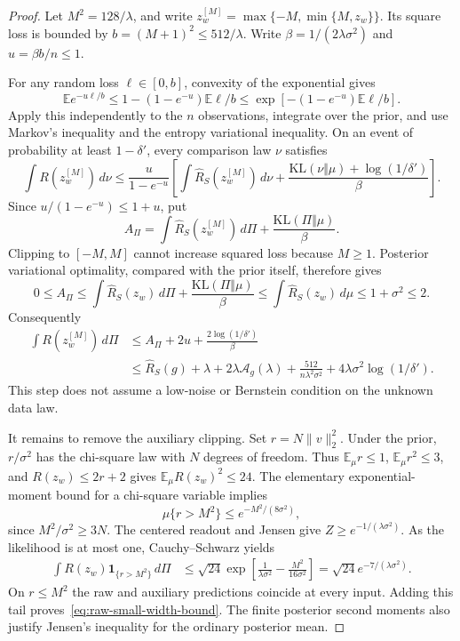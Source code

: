 \begin{proof}
Let $M^2=128/\lambda$, and write
$z_w^{[M]}=\max\{-M,\min\{M,z_w\}\}$.  Its square loss is bounded by
$b=(M+1)^2\leq512/\lambda$.  Write $\beta=1/(2\lambda\sigma^2)$ and
$u=\beta b/n\leq1$.

For any random loss $\ell\in[0,b]$, convexity of the exponential gives
\[
 \mathbb E e^{-u\ell/b}
 \leq1-(1-e^{-u})\mathbb E\ell/b
 \leq\exp[-(1-e^{-u})\mathbb E\ell/b].
\]
Apply this independently to the $n$ observations, integrate over the
prior, and use Markov's inequality and the entropy variational
inequality.  On an event of probability at least $1-\delta'$, every
comparison law $\nu$ satisfies
\[
 \int R(z_w^{[M]})\,d\nu
 \leq\frac{u}{1-e^{-u}}\left[
       \int\widehat R_S(z_w^{[M]})\,d\nu
       +\frac{\mathrm{KL}(\nu\Vert\mu)+\log(1/\delta')}{\beta}
                          \right].
\]
Since $u/(1-e^{-u})\leq1+u$, put
\[
 A_\Pi=\int\widehat R_S(z_w^{[M]})\,d\Pi
                  +\frac{\mathrm{KL}(\Pi\Vert\mu)}\beta.
\]
Clipping to $[-M,M]$ cannot increase squared loss because $M\geq1$.
Posterior variational optimality, compared with the prior itself,
therefore gives
\[
 0\leq A_\Pi
 \leq\int\widehat R_S(z_w)\,d\Pi
                  +\frac{\mathrm{KL}(\Pi\Vert\mu)}\beta
 \leq\int\widehat R_S(z_w)\,d\mu
 \leq1+\sigma^2\leq2.
\]
Consequently
\begin{align*}
 \int R(z_w^{[M]})\,d\Pi
 &\leq A_\Pi+2u+\frac{2\log(1/\delta')}{\beta}\\
 &\leq\widehat R_S(g)+\lambda+2\lambda\mathcal A_g(\lambda)
       +\frac{512}{n\lambda^2\sigma^2}
       +4\lambda\sigma^2\log(1/\delta').
\end{align*}
This step does not assume a low-noise or Bernstein condition on the
unknown data law.

It remains to remove the auxiliary clipping.  Set $r=N\|v\|_2^2$.
Under the prior, $r/\sigma^2$ has the chi-square law with $N$ degrees
of freedom.  Thus $\mathbb E_\mu r\leq1$,
$\mathbb E_\mu r^2\leq3$, and
$R(z_w)\leq2r+2$ gives $\mathbb E_\mu R(z_w)^2\leq24$.
The elementary exponential-moment bound for a chi-square variable
implies
\[
 \mu\{r>M^2\}\leq e^{-M^2/(8\sigma^2)},
\]
since $M^2/\sigma^2\geq3N$.  The centered readout and Jensen give
$Z\geq e^{-1/(\lambda\sigma^2)}$.  As the likelihood is at most one,
Cauchy--Schwarz yields
\begin{align*}
 \int R(z_w)\mathbf1_{\{r>M^2\}}\,d\Pi
 &\leq\sqrt{24}\exp\left[\frac1{\lambda\sigma^2}
                              -\frac{M^2}{16\sigma^2}\right]
 =\sqrt{24}e^{-7/(\lambda\sigma^2)}.
\end{align*}
On $r\leq M^2$ the raw and auxiliary predictions coincide at every
input.  Adding this tail proves~\eqref{eq:raw-small-width-bound}.
The finite posterior second moments also justify Jensen's inequality
for the ordinary posterior mean.
\end{proof}

